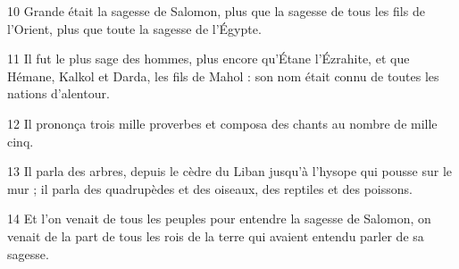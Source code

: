
10 Grande était la sagesse de Salomon, plus que la sagesse de tous les fils de l’Orient, plus que toute la sagesse de l’Égypte.

11 Il fut le plus sage des hommes, plus encore qu’Étane l’Ézrahite, et que Hémane, Kalkol et Darda, les fils de Mahol : son nom était connu de toutes les nations d’alentour.

12 Il prononça trois mille proverbes et composa des chants au nombre de mille cinq.

13 Il parla des arbres, depuis le cèdre du Liban jusqu’à l’hysope qui pousse sur le mur ; il parla des quadrupèdes et des oiseaux, des reptiles et des poissons.

14 Et l’on venait de tous les peuples pour entendre la sagesse de Salomon, on venait de la part de tous les rois de la terre qui avaient entendu parler de sa sagesse.
